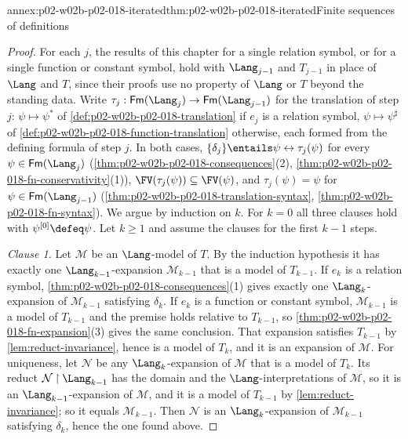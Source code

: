 \begin{annexitem}{annex:p02-w02b-p02-018-iterated}{thm:p02-w02b-p02-018-iterated}{Finite sequences of definitions}
\begin{proof}
For each \(j\), the results of this chapter for a single relation symbol,
or for a single function or constant symbol, hold with \(\Lang_{j-1}\) and
\(T_{j-1}\) in place of \(\Lang\) and \(T\), since their proofs use no
property of \(\Lang\) or \(T\) beyond the standing data.  Write
\(\tau_j:\mathsf{Fm}(\Lang_j)\to\mathsf{Fm}(\Lang_{j-1})\) for the translation
of step \(j\): \(\psi\mapsto\psi^{*}\) of
\cref{def:p02-w02b-p02-018-translation} if \(e_j\) is a relation symbol,
\(\psi\mapsto\psi^{\sharp}\) of
\cref{def:p02-w02b-p02-018-function-translation} otherwise, each formed from
the defining formula of step \(j\).  In both cases,
\(\{\delta_j\}\entails\psi\leftrightarrow\tau_j(\psi)\) for every
\(\psi\in\mathsf{Fm}(\Lang_j)\)
(\cref{thm:p02-w02b-p02-018-consequences}(2),
\cref{thm:p02-w02b-p02-018-fn-conservativity}(1)),
\(\FV(\tau_j(\psi))\subseteq\FV(\psi)\), and \(\tau_j(\psi)=\psi\) for
\(\psi\in\mathsf{Fm}(\Lang_{j-1})\)
(\cref{thm:p02-w02b-p02-018-translation-syntax},
\cref{thm:p02-w02b-p02-018-fn-syntax}).  We argue by
induction on \(k\).  For \(k=0\) all three clauses hold with
\(\psi^{[0]}\defeq\psi\).  Let \(k\geq1\) and assume the clauses for the
first \(k-1\) steps.

\emph{Clause 1.}  Let \(\mathcal M\) be an \(\Lang\)-model of \(T\).  By the
induction hypothesis it has exactly one \(\Lang_{k-1}\)-expansion
\(\mathcal M_{k-1}\) that is a model of \(T_{k-1}\).  If \(e_k\) is a
relation symbol, \cref{thm:p02-w02b-p02-018-consequences}(1) gives exactly
one \(\Lang_k\)-expansion of \(\mathcal M_{k-1}\) satisfying \(\delta_k\).  If
\(e_k\) is a function or constant symbol, \(\mathcal M_{k-1}\) is a model of
\(T_{k-1}\) and the premise holds relative to \(T_{k-1}\), so
\cref{thm:p02-w02b-p02-018-fn-expansion}(3) gives the same
conclusion.  That expansion satisfies \(T_{k-1}\) by
\cref{lem:reduct-invariance}, hence is a model of \(T_k\), and it is an
expansion of \(\mathcal M\).  For uniqueness, let \(\mathcal N\) be any
\(\Lang_k\)-expansion of \(\mathcal M\) that is a model of \(T_k\).  Its
reduct \(\mathcal N\mathbin{\upharpoonright}\Lang_{k-1}\) has the domain and
the \(\Lang\)-interpretations of \(\mathcal M\), so it is an
\(\Lang_{k-1}\)-expansion of \(\mathcal M\), and it is a model of
\(T_{k-1}\) by \cref{lem:reduct-invariance}; so it equals
\(\mathcal M_{k-1}\).  Then \(\mathcal N\) is an \(\Lang_k\)-expansion of
\(\mathcal M_{k-1}\) satisfying \(\delta_k\), hence the one found above.


\end{proof}
\end{annexitem}
